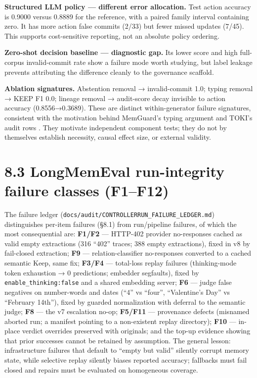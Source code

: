 \textbf{Structured LLM policy --- different error allocation.} Test
action accuracy is 0.9000 versus 0.8889 for the reference, with a paired
family interval containing zero. It has more action false commits (2/33)
but fewer missed updates (7/45). This supports cost-sensitive reporting,
not an absolute policy ordering.

\textbf{Zero-shot decision baseline --- diagnostic gap.} Its lower score
and high full-corpus invalid-commit rate show a failure mode worth
studying, but label leakage prevents attributing the difference cleanly
to the governance scaffold.

\textbf{Ablation signatures.} Abstention removal → invalid-commit 1.0;
typing removal → KEEP F1 0.0; lineage removal → audit-score decay
invisible to action accuracy (0.8556→0.3689). These are distinct
within-generator failure signatures, consistent with the motivation
behind MemGuard's typing argument \citep{ha2026memguard} and TOKI's
audit rows \citep{wang2026toki}. They motivate independent component
tests; they do not by themselves establish necessity, causal effect
size, or external validity.

\section{8.3 LongMemEval run-integrity failure classes
(F1--F12)}\label{longmemeval-run-integrity-failure-classes-f1f12}

The failure ledger
(\texttt{docs/audit/CONTROLLERRUN\_FAILURE\_LEDGER.md}) distinguishes
per-item failures (§8.1) from run/pipeline failures, of which the most
consequential are: \textbf{F1/F2} --- HTTP-402 provider no-responses
cached as valid empty extractions (316 ``402'' traces; 388 empty
extractions), fixed in v8 by fail-closed extraction; \textbf{F9} ---
relation-classifier no-responses converted to a cached semantic Keep,
same fix; \textbf{F3/F4} --- total-loss replay failures (thinking-mode
token exhaustion → 0 predictions; embedder segfaults), fixed by
\texttt{enable\_thinking:false} and a shared embedding server;
\textbf{F6} --- judge false negatives on number-words and dates (``4''
vs ``four'', ``Valentine's Day'' vs ``February 14th''), fixed by guarded
normalization with deferral to the semantic judge; \textbf{F8} --- the
v7 escalation no-op; \textbf{F5/F11} --- provenance defects (misnamed
aborted run; a manifest pointing to a non-existent replay directory);
\textbf{F10} --- in-place verdict overrides preserved with originals;
and the top-up evidence showing that prior successes cannot be retained
by assumption. The general lesson: infrastructure failures that default
to ``empty but valid'' silently corrupt memory state, while selective
replay silently biases reported accuracy; fallbacks must fail closed and
repairs must be evaluated on homogeneous coverage.

